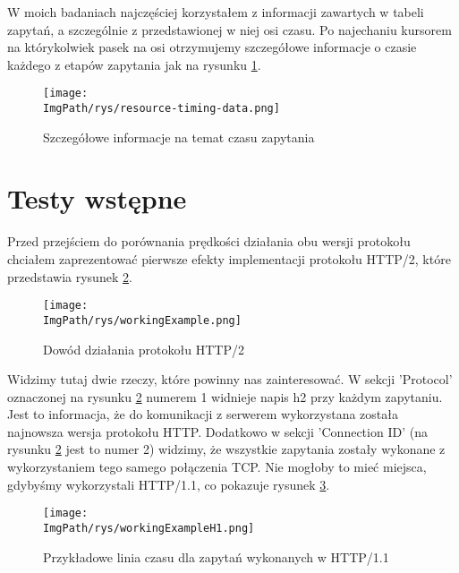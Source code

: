 \documentclass[a4paper,12pt,twoside,openany]{report}
\newcommand{\ImgPath}{.}
\begin{document}
W moich badaniach najczęściej korzystałem z informacji zawartych w tabeli zapytań, a szczególnie z przedstawionej w niej osi czasu.
Po najechaniu kursorem na którykolwiek pasek na osi otrzymujemy szczegółowe informacje o czasie każdego z etapów zapytania jak na rysunku \ref{schematResourceTiming}.

\begin{figure}[!htbp]
	\begin{center}
\centering
\texttt{[image: \\ImgPath/rys/resource-timing-data.png]}
\end{center}
	\caption{Szczegółowe informacje na temat czasu zapytania}
	\label{schematResourceTiming}
\end{figure}

\section{Testy wstępne}

Przed przejściem do porównania prędkości działania obu wersji protokołu chciałem zaprezentować pierwsze efekty implementacji protokołu HTTP/2, które przedstawia rysunek \ref{schematWorkingExample}.

\begin{figure}[!htbp]
	\begin{center}
\centering
\texttt{[image: \\ImgPath/rys/workingExample.png]}
\end{center}
	\caption{Dowód działania protokołu HTTP/2}
	\label{schematWorkingExample}
\end{figure}

Widzimy tutaj dwie rzeczy, które powinny nas zainteresować. W sekcji 'Protocol' oznaczonej na rysunku \ref{schematWorkingExample} numerem 1 widnieje napis h2 przy każdym zapytaniu.
Jest to informacja, że do komunikacji z serwerem wykorzystana została najnowsza wersja protokołu HTTP.
Dodatkowo w sekcji 'Connection ID' (na rysunku \ref{schematWorkingExample} jest to numer 2) widzimy, że wszystkie zapytania zostały wykonane z wykorzystaniem tego samego połączenia TCP.
Nie mogłoby to mieć miejsca, gdybyśmy wykorzystali HTTP/1.1, co pokazuje rysunek \ref{schematWorkingExampleH1}.

\begin{figure}[!htbp]
	\begin{center}
\centering
\texttt{[image: \\ImgPath/rys/workingExampleH1.png]}
\end{center}
	\caption{Przykładowe linia czasu dla zapytań wykonanych w HTTP/1.1}
	\label{schematWorkingExampleH1}
\end{figure}
\end{document}
